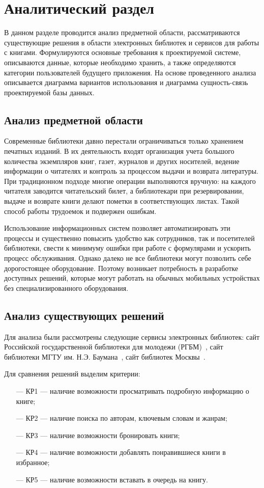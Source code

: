 \chapter{Аналитический раздел}

В данном разделе проводится анализ предметной области, рассматриваются существующие решения в области электронных библиотек и сервисов для работы с книгами. Формулируются основные требования к проектируемой системе, описываются данные, которые необходимо хранить, а также определяются категории пользователей будущего приложения. На основе проведенного анализа описывается диаграмма вариантов использования и диаграмма сущность-связь проектируемой базы данных.

\section{Анализ предметной области}
Современные библиотеки давно перестали ограничиваться только хранением печатных изданий. В их деятельность входят организация учета большого количества экземпляров книг, газет, журналов и других носителей, ведение информации о читателях и контроль за процессом выдачи и возврата литературы. При традиционном подходе многие операции выполняются вручную: на каждого читателя заводится читательский билет, а библиотекари при резервировании, выдаче и возврате книги делают пометки в соответствующих листах. Такой способ работы трудоемок и подвержен ошибкам. 

Использование информационных систем позволяет автоматизировать эти процессы и существенно повысить удобство как сотрудников, так и посетителей библиотеки, свести к минимуму ошибки при работе с формулярами и ускорить процесс обслуживания. Однако далеко не все библиотеки могут позволить себе дорогостоящее оборудование. Поэтому возникает потребность в разработке доступных решений, которые могут работать на обычных мобильных устройствах без специализированного оборудования.

\section{Анализ существующих решений}
Для анализа были рассмотрены следующие сервисы электронных библиотек: сайт Российской государственной библиотеки для молодежи (РГБМ)~\cite{РГБМ}, сайт библиотеки МГТУ им. Н.Э. Баумана~\cite{МГТУ}, сайт библиотек Москвы~\cite{Moscow}.

Для сравнения решений выделим критерии:
\begin{itemize}
    \item[---] КР1 --- наличие возможности просматривать подробную информацию о книге;
    \item[---] КР2 --- наличие поиска по авторам, ключевым словам и жанрам;
    \item[---] КР3 --- наличие возможности бронировать книги;
    \item[---] КР4 --- наличие возможности добавлять понравившиеся книги в избранное;
    \item[---] КР5 --- наличие возможности вставать в очередь на книгу. 
\end{itemize}

